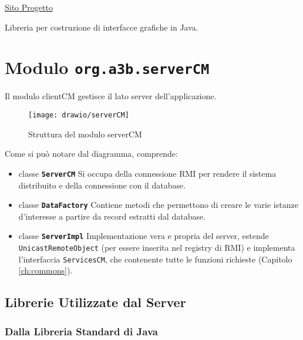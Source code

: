 \href{https://openjfx.io/}{Sito Progetto}

Libreria per costruzione di interfacce grafiche in Java.

\chapter{Modulo \texttt{org.a3b.serverCM}}
\label{ch:server}

Il modulo clientCM gestisce il lato server dell'applicazione.

\begin{figure}[h]
	\centering
	\caption{Struttura del modulo serverCM}
	\label{fig:severcm}
	\texttt{[image: drawio/serverCM]}
\end{figure}
\pagebreak

Come si può notare dal diagramma, comprende:
\begin{itemize}
	\item classe \textbf{\texttt{ServerCM}}
		Si occupa della connessione RMI per rendere il sistema distribuito e della connessione con il database.
	\item classe \textbf{\texttt{DataFactory}}
		Contiene metodi che permettono di creare le varie istanze d'interesse a partire da record estratti dal database. 
	\item classe \textbf{\texttt{ServerImpl}}
		Implementazione vera e propria del server, estende \texttt{UnicastRemoteObject} (per essere inserita nel registry di RMI) e implementa l'interfaccia \texttt{ServicesCM}, che contenente tutte le funzioni richieste (Capitolo \ref{ch:commons}).
\end{itemize}

\section{Librerie Utilizzate dal Server}

\subsection{Dalla Libreria Standard di Java}

